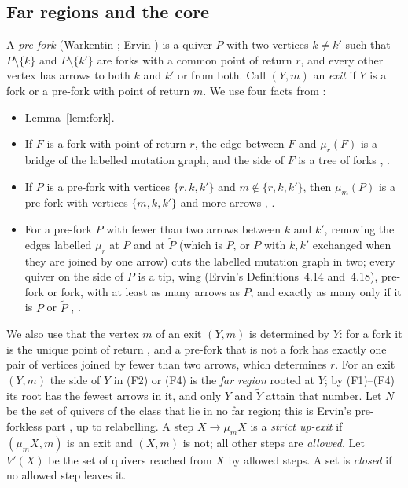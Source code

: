 \documentclass[11pt]{amsart}
\theoremstyle{definition}
\theoremstyle{remark}
\newcommand{\Vp}{V'}
\begin{document}
\subsection{Far regions and the core}
A \emph{pre-fork} (Warkentin \cite[Def.~3.7]{War}; Ervin \cite[Def.~4.5]{Erv}) is a quiver $P$ with two vertices $k\ne k'$ such that $P\setminus\{k\}$ and $P\setminus\{k'\}$ are forks with a common point of return $r$, and every other vertex has arrows to both $k$ and $k'$ or from both. Call $(Y,m)$ an \emph{exit} if $Y$ is a fork or a pre-fork with point of return $m$. We use four facts from \cite{War,Erv}:
\begin{itemize}
\item[(F1)] Lemma~\ref{lem:fork}.
\item[(F2)] If $F$ is a fork with point of return $r$, the edge between $F$ and $\mu_r(F)$ is a bridge of the labelled mutation graph, and the side of $F$ is a tree of forks \cite[Lemma~2.8]{War}, \cite[Lemma~2.8]{Erv}.
\item[(F3)] If $P$ is a pre-fork with vertices $\{r,k,k'\}$ and $m\notin\{r,k,k'\}$, then $\mu_m(P)$ is a pre-fork with vertices $\{m,k,k'\}$ and more arrows \cite[Cor.~6.2]{War}, \cite[Lemma~4.6]{Erv}.
\item[(F4)] For a pre-fork $P$ with fewer than two arrows between $k$ and $k'$, removing the edges labelled $\mu_r$ at $P$ and at $\tilde P$ (which is $P$, or $P$ with $k,k'$ exchanged when they are joined by one arrow) cuts the labelled mutation graph in two; every quiver on the side of $P$ is a tip, wing (Ervin's Definitions~4.14 and~4.18), pre-fork or fork, with at least as many arrows as $P$, and exactly as many only if it is $P$ or $\tilde P$ \cite[Lemmas~6.7, 13.20--13.22]{War}, \cite[Lemma~4.23, Cors.~4.24--4.25]{Erv}.
\end{itemize}
We also use that the vertex $m$ of an exit $(Y,m)$ is determined by $Y$: for a fork it is the unique point of return \cite[Lemma~2.3(e)]{War}, and a pre-fork that is not a fork has exactly one pair of vertices joined by fewer than two arrows, which determines $r$. For an exit $(Y,m)$ the side of $Y$ in (F2) or (F4) is the \emph{far region} rooted at $Y$; by (F1)--(F4) its root has the fewest arrows in it, and only $Y$ and $\tilde Y$ attain that number. Let $N$ be the set of quivers of the class that lie in no far region; this is Ervin's pre-forkless part \cite[Def.~5.1]{Erv}, up to relabelling. A step $X\to\mu_mX$ is a \emph{strict up-exit} if $(\mu_mX,m)$ is an exit and $(X,m)$ is not; all other steps are \emph{allowed}. Let $\Vp(X)$ be the set of quivers reached from $X$ by allowed steps. A set is \emph{closed} if no allowed step leaves it.
\end{document}

